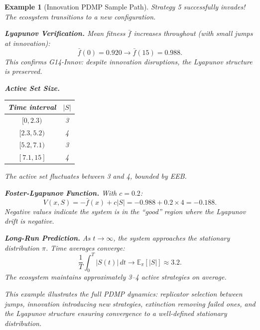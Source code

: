 \documentclass[12pt]{article}
\newtheorem{example}[theorem]{Example}
\newcommand{\E}{\mathbb{E}}
\begin{document}
\begin{example}[Innovation PDMP Sample Path]
Strategy 5 successfully invades! The ecosystem transitions to a new configuration.

\textbf{Lyapunov Verification.}
Mean fitness $\bar{f}$ increases throughout (with small jumps at innovation):
\[
\bar{f}(0) = 0.920 \to \bar{f}(15) = 0.988.
\]
This confirms G14-Innov: despite innovation disruptions, the Lyapunov structure is preserved.

\textbf{Active Set Size.}
\begin{center}
\begin{tabular}{c|c}
\textbf{Time interval} & $|S|$ \\
\hline
$[0, 2.3)$ & 3 \\
$[2.3, 5.2)$ & 4 \\
$[5.2, 7.1)$ & 3 \\
$[7.1, 15]$ & 4 \\
\end{tabular}
\end{center}

The active set fluctuates between 3 and 4, bounded by EEB.

\textbf{Foster-Lyapunov Function.}
With $c = 0.2$:
\[
V(x, S) = -\bar{f}(x) + c|S| = -0.988 + 0.2 \times 4 = -0.188.
\]
Negative values indicate the system is in the ``good'' region where the Lyapunov drift is negative.

\textbf{Long-Run Prediction.}
As $t \to \infty$, the system approaches the stationary distribution $\pi$. Time averages converge:
\[
\frac{1}{T} \int_0^T |S(t)| \, dt \to \E_\pi[|S|] \approx 3.2.
\]
The ecosystem maintains approximately 3--4 active strategies on average.

This example illustrates the full PDMP dynamics: replicator selection between jumps, innovation introducing new strategies, extinction removing failed ones, and the Lyapunov structure ensuring convergence to a well-defined stationary distribution.
\end{example}

\end{document}
